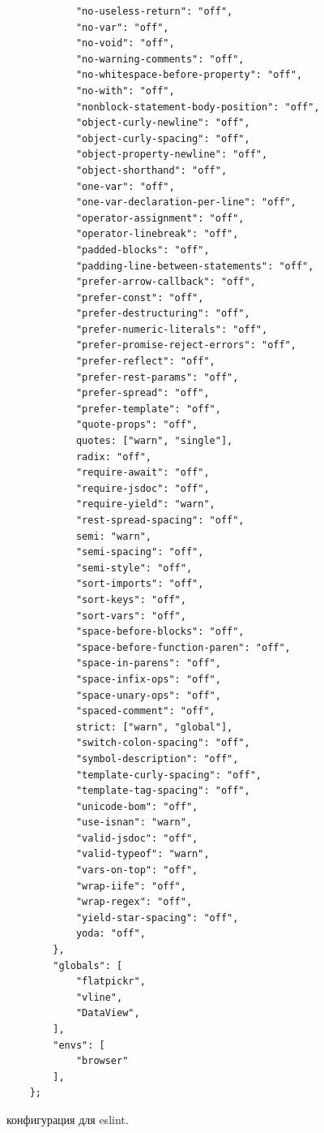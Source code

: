 \begin{figure}[h!]
\begin{small}
\begin{verbatim}
            "no-useless-return": "off",
            "no-var": "off",
            "no-void": "off",
            "no-warning-comments": "off",
            "no-whitespace-before-property": "off",
            "no-with": "off",
            "nonblock-statement-body-position": "off",
            "object-curly-newline": "off",
            "object-curly-spacing": "off",
            "object-property-newline": "off",
            "object-shorthand": "off",
            "one-var": "off",
            "one-var-declaration-per-line": "off",
            "operator-assignment": "off",
            "operator-linebreak": "off",
            "padded-blocks": "off",
            "padding-line-between-statements": "off",
            "prefer-arrow-callback": "off",
            "prefer-const": "off",
            "prefer-destructuring": "off",
            "prefer-numeric-literals": "off",
            "prefer-promise-reject-errors": "off",
            "prefer-reflect": "off",
            "prefer-rest-params": "off",
            "prefer-spread": "off",
            "prefer-template": "off",
            "quote-props": "off",
            quotes: ["warn", "single"],
            radix: "off",
            "require-await": "off",
            "require-jsdoc": "off",
            "require-yield": "warn",
            "rest-spread-spacing": "off",
            semi: "warn",
            "semi-spacing": "off",
            "semi-style": "off",
            "sort-imports": "off",
            "sort-keys": "off",
            "sort-vars": "off",
            "space-before-blocks": "off",
            "space-before-function-paren": "off",
            "space-in-parens": "off",
            "space-infix-ops": "off",
            "space-unary-ops": "off",
            "spaced-comment": "off",
            strict: ["warn", "global"],
            "switch-colon-spacing": "off",
            "symbol-description": "off",
            "template-curly-spacing": "off",
            "template-tag-spacing": "off",
            "unicode-bom": "off",
            "use-isnan": "warn",
            "valid-jsdoc": "off",
            "valid-typeof": "warn",
            "vars-on-top": "off",
            "wrap-iife": "off",
            "wrap-regex": "off",
            "yield-star-spacing": "off",
            yoda: "off",
        },
        "globals": [
            "flatpickr",
            "vline",
            "DataView",
        ],
        "envs": [
            "browser"
        ],
    };
\end{verbatim}
\end{small}
    \caption{конфигурация для eslint.}
\end{figure}


